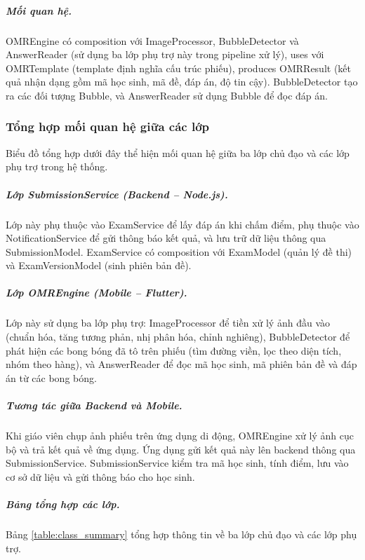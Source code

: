 ﻿\documentclass[../DoAn.tex]{subfiles}
\begin{document}
\subparagraph{Mối quan hệ.} OMREngine có composition với ImageProcessor, BubbleDetector và AnswerReader (sử dụng ba lớp phụ trợ này trong pipeline xử lý), uses với OMRTemplate (template định nghĩa cấu trúc phiếu), produces OMRResult (kết quả nhận dạng gồm mã học sinh, mã đề, đáp án, độ tin cậy). BubbleDetector tạo ra các đối tượng Bubble, và AnswerReader sử dụng Bubble để đọc đáp án.

\vspace{0.3cm}

\subsubsection{Tổng hợp mối quan hệ giữa các lớp}
\label{subsubsection:4.2.2.4}

Biểu đồ tổng hợp dưới đây thể hiện mối quan hệ giữa ba lớp chủ đạo và các lớp phụ trợ trong hệ thống.

\subparagraph{Lớp SubmissionService (Backend -- Node.js).} Lớp này phụ thuộc vào ExamService để lấy đáp án khi chấm điểm, phụ thuộc vào NotificationService để gửi thông báo kết quả, và lưu trữ dữ liệu thông qua SubmissionModel. ExamService có composition với ExamModel (quản lý đề thi) và ExamVersionModel (sinh phiên bản đề).

\subparagraph{Lớp OMREngine (Mobile -- Flutter).} Lớp này sử dụng ba lớp phụ trợ: ImageProcessor để tiền xử lý ảnh đầu vào (chuẩn hóa, tăng tương phản, nhị phân hóa, chỉnh nghiêng), BubbleDetector để phát hiện các bong bóng đã tô trên phiếu (tìm đường viền, lọc theo diện tích, nhóm theo hàng), và AnswerReader để đọc mã học sinh, mã phiên bản đề và đáp án từ các bong bóng.

\subparagraph{Tương tác giữa Backend và Mobile.} Khi giáo viên chụp ảnh phiếu trên ứng dụng di động, OMREngine xử lý ảnh cục bộ và trả kết quả về ứng dụng. Ứng dụng gửi kết quả này lên backend thông qua SubmissionService. SubmissionService kiểm tra mã học sinh, tính điểm, lưu vào cơ sở dữ liệu và gửi thông báo cho học sinh.

\subparagraph{Bảng tổng hợp các lớp.} Bảng \ref{table:class_summary} tổng hợp thông tin về ba lớp chủ đạo và các lớp phụ trợ.
\end{document}
